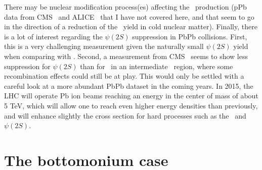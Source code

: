 There may be nuclear
modification process(es) affecting the \Jpsi~production (pPb data from CMS~\cite{14009} and
ALICE~\cite{alicejpsipPb} that I have not covered here, and that seem to go in the direction
of a reduction of the \Jpsi~yield in cold nuclear matter). Finally, there is a lot of interest regarding the $\psi(2S)$
suppression in PbPb collisions. First, this is a very challenging measurement
given the naturally small $\psi(2S)$ yield when comparing with
\Jpsi. Second, a measurement from CMS~\cite{Khachatryan:2014bva} seems to show less suppression
for $\psi(2S)$ than for \Jpsi\ in an intermediate \pt\ region, where
some recombination effects could still be at play. This would only be
settled with a careful look at a more abundant PbPb dataset in the
coming years. In 2015, the LHC will operate Pb ion beams reaching an energy
in the center of mass of about 5 TeV, which will allow one to reach even
higher energy densities than previously, and will enhance slightly the
cross section for hard processes such as the \Jpsi\ and $\psi(2S)$.




\clearpage
\section{The bottomonium case}

